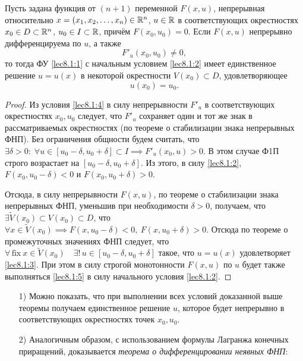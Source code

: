\documentclass[../../main.tex]{subfiles}
\begin{document}
	 \begin{thm}
		Пусть задана функция от $(n+1)$ переменной $F(x, u)$, непрерывная 
		относительно $x = (x_1, x_2, \ldots,
	 	x_n) \in \mathbb{R}^n$, $u \in \mathbb{R}$ в соответствующих окрестностях $x_0 \in D 
	 	\subset \mathbb{R}^n$, $u_0 \in I \subset \mathbb{R}$, причём $F(x_0,u_0)=0$. Если $F(x,u)$ 
	 	непрерывно дифференцируема по $u$, а также 
		\begin{equation}
			F'_u(x_0, u_0) \ne 0, \label{lec8.1:4}
		\end{equation}
		то тогда ФУ \eqref{lec8.1:1} с начальным условием \eqref{lec8.1:2} имеет 
		единственное решение $u = u(x)$ в некоторой окрестности $V(x_0) 
		\subset D$, удовлетворяющее
	 	\begin{equation}
			u(x_0) = u_0. \label{lec8.1:5}
		\end{equation}
	 \end{thm}
	 \begin{proof}
		 Из условия \eqref{lec8.1:4} в силу непрерывности $F'_u$ в 
		 соответствующих окрестностях $x_0, u_0$ следует, что $F'_u$ сохраняет 
		 один и тот же знак в рассматриваемых окрестностях (по теореме о 
		 стабилизации знака непрерывных ФНП). Без ограничения общности 
		 будем считать, что $\exists \delta > 0: \; 
		 \forall u \in [u_0 - \delta, 
		 u_0 + \delta] \subset I \implies F'_u(x_0, u)>0$. В этом случае Ф1П
		 строго возрастает на $[u_0 - \delta, u_0 + \delta]$. Из этого, в силу 
		 \eqref{lec8.1:2}, $F(x_0, u_0 - \delta) < 0$ и
		 $ F(x_0, u_0 + \delta) > 0$.

		 Отсюда, в силу непрерывности
		 $F(x,u)$, по теореме о стабилизации  знака непрерывных ФНП, 
		 уменьшив при необходимости
		 $\delta > 0$, получаем, что $\exists \widetilde V(x_0) \subset V(x_0) 
		 \subset D$, что $\forall x \in \widetilde V(x_0) \implies F(x, u_0 - 
		 \delta) < 0,\ F(x, u_0 + \delta) > 0$. Отсюда по теореме о промежуточных 
		 значениях ФНП следует, что $\forall\, \text{fix} 
		 \: x \in \widetilde V(x_0) \quad \exists! \,
		 u \in [u_0 - \delta, u_0 + \delta]$ такое, что $u = u(x)$ удовлетворяет 
		 \eqref{lec8.1:3}. При этом в силу строгой монотонности $F(x, u)$ по $u$ 
		 будет также выполняться \eqref{lec8.1:5} в силу начального условия 
		 \eqref{lec8.1:2}. 
	 \end{proof}

	 \begin{rems}
	 \;
		 \begin{itemize}
		 	 \item[1)] Можно показать, что при выполнении всех условий 
		 	 доказанной выше теоремы получаем единственное решение $u$, 
		 	 которое будет непрерывно в соответствующих окрестностях точек 
		 	 $x_0, u_0$.

			 \item[2)] Аналогичным образом, с использованием формулы Лагранжа 
			 конечных приращений, доказывается \emph{теорема о 
			 дифференцировании неявных ФНП}:
		\end{itemize}
	\end{rems}
\end{document}
